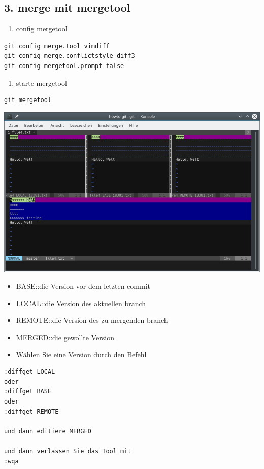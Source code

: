 \documentclass[11pt]{article}
\begin{document}
\subsection{3. merge mit mergetool}
\label{sec:org459b99f}

\begin{enumerate}
\item config mergetool
\end{enumerate}

\begin{verbatim}
git config merge.tool vimdiff
git config merge.conflictstyle diff3
git config mergetool.prompt false
\end{verbatim}

\begin{enumerate}
\item starte mergetool
\end{enumerate}
\begin{verbatim}
git mergetool
\end{verbatim}

\begin{center}
\includegraphics[width=.9\linewidth]{./img/git-mergetool-vimdiff.png}
\end{center}

\begin{itemize}
\item BASE::die Version vor dem letzten commit
\item LOCAL::die Version des aktuellen branch
\item REMOTE::die Version des zu mergenden branch
\item MERGED::die gewollte Version

\item Wählen Sie eine Version durch den Befehl
\end{itemize}
\begin{verbatim}
:diffget LOCAL
oder
:diffget BASE
oder
:diffget REMOTE

und dann editiere MERGED

und dann verlassen Sie das Tool mit
:wqa
\end{verbatim}
\end{document}
